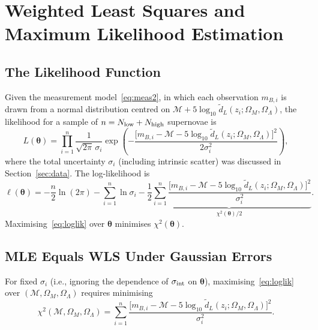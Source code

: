 \documentclass[12pt]{article}
\begin{document}
\section{Weighted Least Squares and Maximum Likelihood Estimation}
\label{sec:wls}

\subsection{The Likelihood Function}

Given the measurement model~\eqref{eq:meas2}, in which each observation
$m_{B,i}$ is drawn from a normal distribution centred on $\mathcal{M} +
5\log_{10}\tilde d_L(z_i;\Omega_M,\Omega_\Lambda)$, the likelihood for
a sample of $n = N_{\rm low} + N_{\rm high}$ supernovae is
\begin{equation}\label{eq:lik}
  L(\boldsymbol\theta) =
  \prod_{i=1}^n \frac{1}{\sqrt{2\pi}\,\sigma_i}
  \exp\!\left(-\frac{\bigl[m_{B,i} - \mathcal{M}
    - 5\log_{10}\tilde d_L(z_i;\Omega_M,\Omega_\Lambda)\bigr]^2}
    {2\sigma_i^2}\right),
\end{equation}
where the total uncertainty $\sigma_i$ (including intrinsic scatter)
was discussed in Section~\ref{sec:data}.  The log-likelihood is
\begin{equation}\label{eq:loglik}
  \ell(\boldsymbol\theta) =
  -\frac{n}{2}\ln(2\pi)
  - \sum_{i=1}^n \ln\sigma_i
  - \underbrace{\frac{1}{2}\sum_{i=1}^n
    \frac{\bigl[m_{B,i} - \mathcal{M}
    - 5\log_{10}\tilde d_L(z_i;\Omega_M,\Omega_\Lambda)\bigr]^2}
    {\sigma_i^2}}_{\displaystyle\chi^2(\boldsymbol\theta)/2}.
\end{equation}
Maximising~\eqref{eq:loglik} over $\boldsymbol\theta$ minimises
$\chi^2(\boldsymbol\theta)$.

\subsection{MLE Equals WLS Under Gaussian Errors}

For fixed $\sigma_i$ (i.e., ignoring the dependence of $\sigma_{\rm int}$
on $\boldsymbol\theta$), maximising~\eqref{eq:loglik} over
$(\mathcal{M},\Omega_M,\Omega_\Lambda)$ requires minimising
\begin{equation}\label{eq:chi2}
  \chi^2(\mathcal{M},\Omega_M,\Omega_\Lambda) =
  \sum_{i=1}^n
  \frac{\bigl[m_{B,i} - \mathcal{M}
    - 5\log_{10}\tilde d_L(z_i;\Omega_M,\Omega_\Lambda)\bigr]^2}{\sigma_i^2}.
\end{equation}
\end{document}
